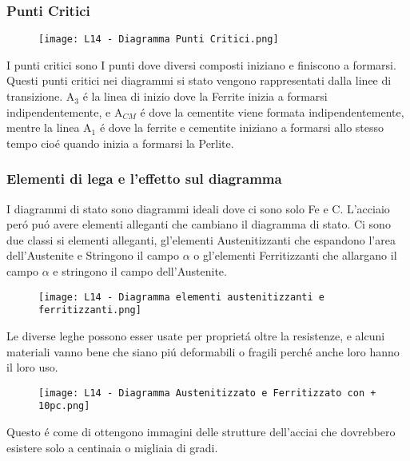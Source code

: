 \documentclass{article}
\begin{document}
{            \subsubsection{Punti Critici}
                \begin{figure}[h!]
                    \centering
                    \texttt{[image: L14 - Diagramma Punti Critici.png]}
                \end{figure}
                I punti critici sono I punti dove diversi composti iniziano e finiscono a formarsi. Questi punti critici nei diagrammi si stato vengono rappresentati dalla linee di transizione. A$_3$ \'e la linea di inizio dove la Ferrite inizia a formarsi indipendentemente, e A$_{CM}$ \'e dove la cementite viene formata indipendentemente, mentre la linea A$_1$ \'e dove la ferrite e cementite iniziano a formarsi allo stesso tempo cio\'e quando inizia a formarsi la Perlite.\\

            \subsubsection{Elementi di lega e l'effetto sul diagramma}
                I diagrammi di stato sono diagrammi ideali dove ci sono solo Fe e C. L'acciaio per\'o pu\'o avere elementi alleganti che cambiano il diagramma di stato. Ci sono due classi si elementi alleganti, gl'elementi Austenitizzanti che espandono l'area dell'Austenite e Stringono il campo $\alpha$ o gl'elementi Ferritizzanti che allargano il campo $\alpha$ e stringono il campo dell'Austenite.\\
            \newpage
                \begin{figure}[h!]
                    \centering
                    \texttt{[image: L14 - Diagramma elementi austenitizzanti e ferritizzanti.png]}
                \end{figure}
                Le diverse leghe possono esser usate per propriet\'a oltre la resistenze, e alcuni materiali vanno bene che siano pi\'u deformabili o fragili perch\'e anche loro hanno il loro uso.\\
                \begin{figure}[h!]
                    \centering
                    \texttt{[image: L14 - Diagramma Austenitizzato e Ferritizzato con + 10pc.png]}
                \end{figure}
                Questo \'e come di ottengono immagini delle strutture dell'acciai che dovrebbero esistere solo a centinaia o migliaia di gradi.\\
        \newpage
}
\end{document}
